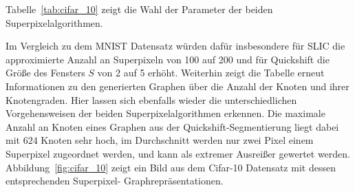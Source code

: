 Tabelle~\ref{tab:cifar_10} zeigt die Wahl der Parameter der beiden Superpixelalgorithmen.
\begin{table}[t]
\centering
{}
\caption[\gls{Cifar}-10 Superpixelparameter]{Wahl der Superpixelparameter des \gls{Cifar}-10 Datensatzes.}
\label{tab:cifar_10}
\end{table}
Im Vergleich zu dem \gls{MNIST} Datensatz würden dafür insbesondere für \gls{SLIC} die approximierte Anzahl an Superpixeln von 100 auf 200 und für Quickshift die Größe des Fensters $S$ von 2 auf 5 erhöht.
Weiterhin zeigt die Tabelle erneut Informationen zu den generierten Graphen über die Anzahl der Knoten und ihrer Knotengraden.
Hier lassen sich ebenfalls wieder die unterschiedlichen Vorgehensweisen der beiden Superpixelalgorithmen erkennen.
Die maximale Anzahl an Knoten eines Graphen aus der Quickshift-Segmentierung liegt dabei mit $624$ Knoten sehr hoch, \dhe{} im Durchschnitt werden nur zwei Pixel einem Superpixel zugeordnet werden, und kann als extremer Ausreißer gewertet werden.
Abbildung~\ref{fig:cifar_10} zeigt ein Bild aus dem \gls{Cifar}-10 Datensatz mit dessen entsprechenden Superpixel- \bzw{} Graphrepräsentationen.


